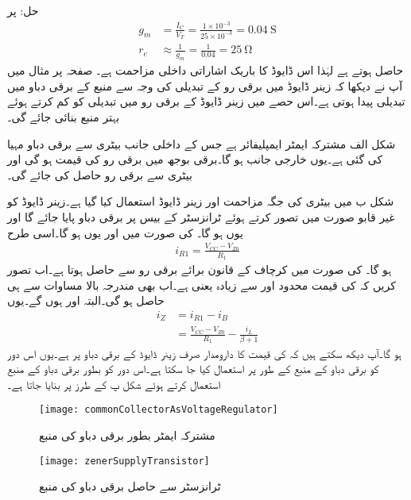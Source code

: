 حل: پر 
\begin{align*}
g_m &=\frac{I_C}{V_T}=\frac{1 \times 10^{-3}}{25 \times 10^{-3}}=\SI{0.04}{\siemens}\\
r_e& \approx \frac{1}{g_m}=\frac{1}{0.04}=\SI{25}{\ohm}
\end{align*}
حاصل ہوتے ہے لہٰذا اس ڈایوڈ کا باریک اشاراتی داخلی مزاحمت  ہے۔
صفحہ  پر مثال  میں آپ نے دیکھا کہ زینر ڈایوڈ میں برقی رو کے تبدیلی کی وجہ سے منبع کے برقی دباو میں تبدیلی پیدا ہوتی ہے۔اس حصے میں زینر ڈایوڈ کے برقی رو میں تبدیلی کو کم کرتے ہوئے بہتر منبع بنائی جائے گی۔

شکل  الف مشترکہ ایمٹر ایمپلیفائر ہے جس کے داخلی جانب بیٹری سے  برقی دباو مہیا کی گئی ہے۔یوں  خارجی جانب  ہو گا۔برقی بوجھ  میں برقی رو  کی قیمت  ہو گی اور بیٹری سے  برقی رو حاصل کی جائے گی۔

شکل  ب میں بیٹری کی جگہ مزاحمت  اور زینر ڈایوڈ استعمال کیا گیا ہے۔زینر ڈایوڈ کو غیر قابو صورت میں تصور کرتے ہوئے ٹرانزسٹر کے بیس پر  برقی دباو پایا جائے گا اور یوں  ہو گا۔ کی صورت میں  اور یوں  ہو گا۔اسی طرح
\begin{align}
i_{R1}=\frac{V_{CC}-V_{Z0}}{R_1}
\end{align}
ہو گا۔ کی صورت میں کرچاف کے قانون برائے برقی رو  سے   حاصل ہوتا ہے۔اب تصور کریں کہ  کی قیمت محدود اور  سے زیادہ یعنی  ہے۔اب بھی  مندرجہ بالا مساوات سے ہی حاصل ہو گی۔البتہ  اور  ہوں گے۔یوں 
\begin{align*}
i_Z&=i_{R1}-i_B\\
&=\frac{V_{CC}-V_{Z0}}{R_1}-\frac{i_L}{\beta+1}
\end{align*}
ہو گا۔آپ دیکھ سکتے ہیں کہ  کی قیمت کا دارومدار صرف زینر ڈایوڈ کے برقی دباو پر ہے۔یوں اس دور کو برقی دباو کے منبع کے طور پر استعمال کیا جا سکتا ہے۔اس دور کو بطور برقی دباو کے منبع استعمال کرتے ہوئے شکل  پ کے طرز پر بنایا جاتا ہے۔
%
\begin{figure}
\centering
\texttt{[image: commonCollectorAsVoltageRegulator]}
\caption{مشترکہ ایمٹر بطور برقی دباو کی منبع}
\label{شکل_ٹرانزسٹر_مشترکہ_مخارج_بطور_منبع}
\end{figure}
%
\begin{figure}
\centering
\texttt{[image: zenerSupplyTransistor]}
\caption{ٹرانزسٹر سے حاصل برقی دباو کی منبع}
\label{شکل_دو_جوڑ_ٹرانزسٹر_منبع_الف}
\end{figure}

